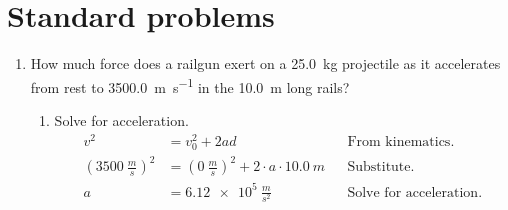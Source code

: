 \documentclass[letterpaper, 12pt]{report}
\begin{document}
\section*{Standard problems}
\begin{enumerate}
    \item How much force does a railgun exert on a \SI{25.0}{kg} projectile as it accelerates from rest to \SI{3500.0}{\meter\per\second} in the \SI{10.0}{m} long rails? 
    \begin{enumerate}
        \item Solve for acceleration.
                \begin{align}
                    v^2                         &= v_0^2 + 2ad && \text{From kinematics.} \\
                    (\SI{3500}{\frac{m}{s}})^2  &= (\SI{0}{\frac{m}{s}})^2 + 2 \cdot a \cdot \SI{10.0}{m} && \text{Substitute.} \\
                    a                           &= \SI{6.12e5}{\frac{m}{s^2}} && \text{Solve for acceleration.}
                \end{align}
                

\end{enumerate}
\end{enumerate}
\end{document}

